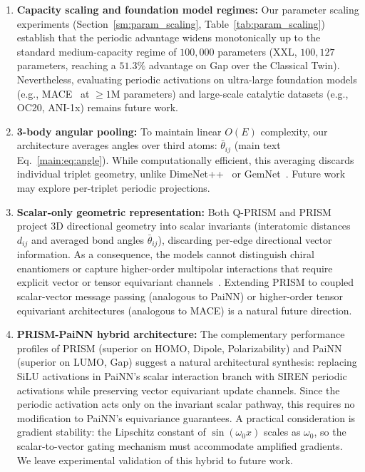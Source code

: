 \documentclass[10pt,twocolumn,letterpaper]{article}
\begin{document}
\begin{enumerate}
    \item \textbf{Capacity scaling and foundation model regimes:} Our parameter scaling experiments (Section~\ref{sm:param_scaling}, Table~\ref{tab:param_scaling}) establish that the periodic advantage widens monotonically up to the standard medium-capacity regime of $100{,}000$ parameters (XXL, $100{,}127$ parameters, reaching a $51.3\%$ advantage on Gap over the Classical Twin). Nevertheless, evaluating periodic activations on ultra-large foundation models (e.g., MACE~\cite{batatiaMACEHigherOrder2022} at $\ge 1\mathrm{M}$ parameters) and large-scale catalytic datasets (e.g., OC20, ANI-1x) remains future work.
    \item \textbf{3-body angular pooling:} To maintain linear $O(E)$ complexity, our architecture averages angles over third atoms: $\bar{\theta}_{ij}$ (main text Eq.~\ref{main:eq:angle}). While computationally efficient, this averaging discards individual triplet geometry, unlike DimeNet++~\cite{klicperaFastUncertaintyAwareDirectional2020} or GemNet~\cite{klicperaGemNetUniversalDirectional2021}. Future work may explore per-triplet periodic projections.
    \item \textbf{Scalar-only geometric representation:} Both Q-PRISM and PRISM project 3D directional geometry into scalar invariants (interatomic distances $d_{ij}$ and averaged bond angles $\bar{\theta}_{ij}$), discarding per-edge directional vector information. As a consequence, the models cannot distinguish chiral enantiomers or capture higher-order multipolar interactions that require explicit vector or tensor equivariant channels~\cite{schuttEquivariantMessagePassing2021, batatiaMACEHigherOrder2022}. Extending PRISM to coupled scalar-vector message passing (analogous to PaiNN) or higher-order tensor equivariant architectures (analogous to MACE) is a natural future direction.
    \item \textbf{PRISM-PaiNN hybrid architecture:} The complementary performance profiles of PRISM (superior on HOMO, Dipole, Polarizability) and PaiNN (superior on LUMO, Gap) suggest a natural architectural synthesis: replacing SiLU activations in PaiNN's scalar interaction branch with SIREN periodic activations while preserving vector equivariant update channels. Since the periodic activation acts only on the invariant scalar pathway, this requires no modification to PaiNN's equivariance guarantees. A practical consideration is gradient stability: the Lipschitz constant of $\sin(\omega_0 x)$ scales as $\omega_0$, so the scalar-to-vector gating mechanism must accommodate amplified gradients. We leave experimental validation of this hybrid to future work.

\end{enumerate}
\end{document}
